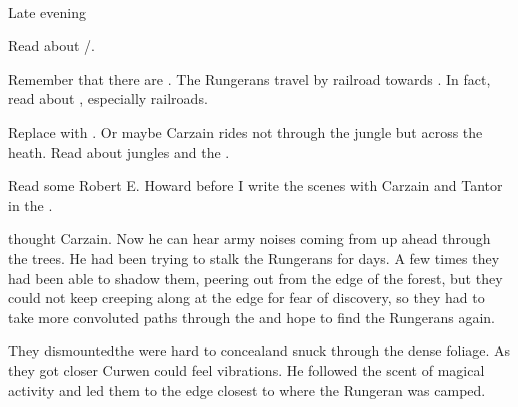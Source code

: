 
\begin{comment}
\subsection{Curwen spies on Rungerans}
\end{comment}
\stamp
  {\dateSortieInCombat}
  {\\
   Late evening}


    
Read about /. 
    
Remember that there are . 
The Rungerans travel by railroad towards \Forklin. 
In fact, read about , especially railroads. 

Replace  with . 
Or maybe Carzain rides not through the jungle but across the heath. 
Read about jungles and the \wylde. 

Read some Robert E. Howard before I write the scenes with Carzain and Tantor in the \wylde. 

 thought Carzain. 
Now he can hear army noises coming from up ahead through the trees. 
He had been trying to stalk the Rungerans for days. 
A few times they had been able to shadow them, peering out from the edge of the forest, but they could not keep creeping along at the edge for fear of discovery, so they had to take more convoluted paths through the \Wylde{} and hope to find the Rungerans again. 



They dismounted\dash the \relcs{} were hard to conceal\dash and snuck through the dense foliage. 
As they got closer Curwen could feel vibrations. 
He followed the scent of magical activity and led them to the edge closest to where the Rungeran \ishrah{} was camped. 

